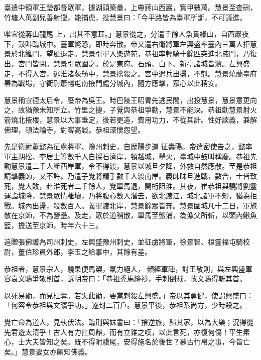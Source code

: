 \begin{pinyinscope}
 臺遣中領軍王瑩都督眾軍，據湖頭築壘，上帶蔣山西巖，實甲數萬。慧景至查硎，竹塘人萬副兒善射獵，能捕虎，投慧景曰：「今平路皆為臺軍所斷，不可議進。



 唯宜從蔣山龍尾
 上，出其不意耳。」慧景從之，分遣千餘人魚貫緣山，自西巖夜下，鼓叫臨城中。臺軍驚恐，即時奔散。帝又遣右衛將軍左興盛率臺內三萬人拒慧景於北籬門，望風退走。慧景引軍入樂遊苑，恭祖率輕騎十餘匹突進北掖門，乃復出，宮門皆閉。慧景引眾圍之。於是東府、石頭、白下、新亭諸城皆潰。左興盛走，不得入宮，逃淮渚荻舫中，慧景擒殺之。宮中遣兵出盪，不剋。慧景燒蘭臺府署為戰場，守衛尉蕭暢屯南掖門處分城內，隨方應擊，眾心以此稍安。



 慧景稱宣德太后令，廢帝為吳王。時巴陵王昭胄先逃民間，出投慧景，慧景意更向之，故猶豫未知所立。竹里之捷，子覺與恭祖爭勳，慧景不能決。恭祖勸慧景射火箭燒北掖樓，慧景以大事垂定，後若更造，費用功力，不從其計。性好談義，兼解佛理，頓法輪寺，對客高談。恭祖深懷怨望。



 先是衛尉蕭懿為征虜將軍、豫州刺史，自歷陽步道
 征壽陽。帝遣密使告之，懿率軍主胡松、李居士等數千人自採石濟岸，頓越城，舉火，臺城中鼓叫稱慶。恭祖先勸慧景遣二千人斷西岸軍，令不得渡，慧景以城旦夕降，外救自然應散。至是恭祖請擊義師，又不許。乃遣子覺將精手數千人渡南岸。義師昧旦進戰，數合，士皆致死，覺大敗，赴淮死者二千餘人，覺單馬退，開桁阻淮。其夜，崔恭祖與驍將劉靈運詣城降，慧景眾情離壞，乃將腹心數人潛去，欲北渡江，城北諸軍不知，猶為拒戰。城內出盪，殺數百人。義軍渡北岸，慧景餘眾皆奔。慧景圍城凡十二日，軍旅散在京師，不為營壘。及走，眾於道稍散，單馬至蟹浦，為漁父所斬，以頭內鰍魚籃，擔送至京師，時年六十三。



 追贈張佛護為司州刺史，左興盛豫州刺史，並征虜將軍，徐景智、桓靈福屯騎校尉，董伯珍員外郎，李玉之給事中，其餘有差。



 恭祖者，慧景宗人，驍果便馬槊，氣力絕人，
 頻經軍陣，討王敬則，與左興盛軍容袁文曠爭敬則首，訴明帝曰：「恭祖禿馬絳衫，手刺倒賊，故文曠得斬其首。



 以死易勛，而見枉奪。若失此勛，要當刺殺左興盛。」帝以其勇健，使謂興盛曰：「何容令恭祖與文曠爭功。」遂封二百戶。慧景平後，恭祖系尚方，少時殺之。



 覺亡命為道人，見執伏法。臨刑與妹書曰：「捨逆旅，歸其家，以為大樂；況得從先君遊太清乎！古人有力扛周鼎，而有立錐之嘆，以此言死，亦復何傷！平生素心，士大夫皆知之矣。既不得附驥尾，安得施名於後世？慕古竹帛之事，今皆亡矣。」慧景妻女亦頗知佛義。




\end{pinyinscope}
